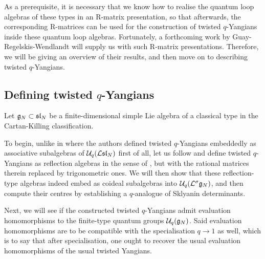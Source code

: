         As a prerequisite, it is necessary that we know how to realise the quantum loop algebras of these types in an R-matrix presentation, so that afterwards, the corresponding R-matrices can be used for the construction of twisted $q$-Yangians inside these quantum loop algebras. Fortunately, a forthcoming work by Guay-Regelskis-Wendlandt will supply us with such R-matrix presentations. Therefore, we will be giving an overview of their results, and then move on to describing twisted $q$-Yangians.

    \subsection{\texorpdfstring{Defining twisted $q$-Yangians}{}}
        Let $\mathfrak{g}_N \subset \mathfrak{sl}_N$ be a finite-dimensional simple Lie algebra of a classical type in the Cartan-Killing classification.
    
        To begin, unlike in \cite{molev_ragoucy_sorba_twisted_q_yangians_type_A} where the authors defined twisted $q$-Yangians embeddedly as associative subalgebras of $\mathcal{U}_q(\mathcal{L}\mathfrak{sl}_N)$ first of all, let us follow \cite{regelskis_vlaar_reflection_matrices_coideal_subalgebras} and define twisted $q$-Yangians as reflection algebras in the sense of \cite{guay_regelskis_twisted_yangians_for_symmetric_pairs_of_types_BCD}, but with the rational matrices therein replaced by trigonometric ones. We will then show that these reflection-type algebras indeed embed as coideal subalgebras into $\mathcal{U}_q(\mathcal{L}^{\sigma}\mathfrak{g}_N)$, and then compute their centres by establishing a $q$-analogue of Sklyanin determinants.

        Next, we will see if the constructed twisted $q$-Yangians admit evaluation homomorphisms to the finite-type quantum groups $\mathcal{U}_q(\mathfrak{g}_N)$. Said evaluation homomorphisms are to be compatible with the specialisation $q \to 1$ as well, which is to say that after specialisation, one ought to recover the usual evaluation homomorphisms of the usual twisted Yangians.